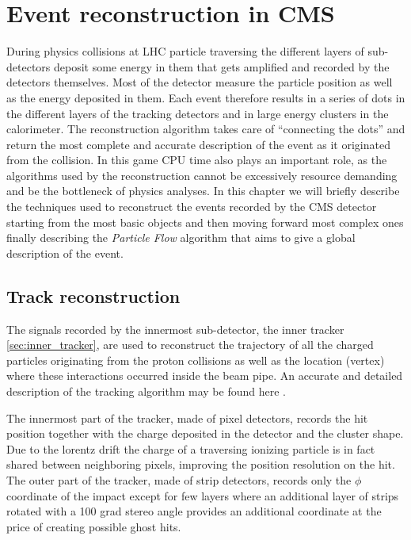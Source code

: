 \chapter{Event reconstruction in CMS}

During physics collisions at LHC particle traversing the different layers of sub-detectors deposit some energy in them that gets amplified and recorded by the detectors themselves. Most of the detector measure the particle position as well as the energy deposited in them. Each event therefore results in a series of dots in the different layers of the tracking detectors and in large energy clusters in the calorimeter. The reconstruction algorithm takes care of ``connecting the dots'' and return the most complete and accurate description of the event as it originated from the collision. In this game CPU time also plays an important role, as the algorithms used by the reconstruction cannot be excessively resource demanding and be the bottleneck of physics analyses. In this chapter we will briefly describe the techniques used to reconstruct the events recorded by the CMS detector starting from the most basic objects and then moving forward most complex ones finally describing the \emph{Particle Flow} algorithm that aims to give a global description of the event.

\section{Track reconstruction}

The signals recorded by the innermost sub-detector, the inner tracker \ref{sec:inner_tracker}, are used to reconstruct the trajectory of all the charged particles originating from the proton collisions as well as the location (vertex) where these interactions occurred inside the beam pipe. An accurate and detailed description of the tracking algorithm may be found here \cite{cms_trk_11_01}.

The innermost part of the tracker, made of pixel detectors, records the hit position together with the charge deposited in the detector and the cluster shape. Due to the lorentz drift the charge of a traversing ionizing particle is in fact shared between neighboring pixels, improving the position resolution on the hit. The outer part of the tracker, made of strip detectors, records only the $\phi$ coordinate of the impact except for few layers where an additional layer of strips rotated with a 100 grad stereo angle provides an additional coordinate at the price of creating possible ghost hits.

